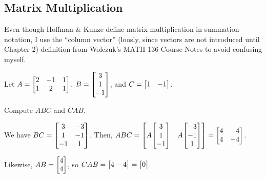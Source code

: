 \subsection{Matrix Multiplication}

Even though Hoffman \& Kunze define matrix multiplication in summation notation,
I use the ``column vector'' (loosly, since vectors are not introduced until Chapter 2) definition
from Wolczuk's MATH 136 Course Notes to avoid confusing myself.

\begin{xca}
  Let $A = \mqty[2&-1&1 \\ 1&2&1]$, $B = \mqty[3\\1\\-1]$, and $C = \mqty[1&-1]$.

  Compute $ABC$ and $CAB$.
\end{xca}
\begin{sol}
  We have $BC = \mqty[3&-3 \\ 1&-1 \\ -1&1]$.
  Then, $ABC = \mqty[A\mqty[3\\1\\-1] & A\mqty[-3\\-1\\1]] = \mqty[4&-4 \\ 4&-4]$.

  Likewise, $AB = \mqty[4\\4]$, so $CAB = \mqty[4-4] = \mqty[0]$.
\end{sol}

